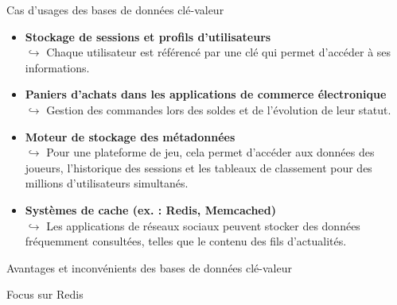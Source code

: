 \begin{frame}{Cas d'usages des bases de données clé-valeur}
    \begin{itemize}
        \item \textbf{Stockage de sessions et profils d'utilisateurs}\\
        $\hookrightarrow$ Chaque utilisateur est référencé par une clé qui permet d'accéder à ses informations.
        \vspace{0.3cm}

        \item \textbf{Paniers d'achats dans les applications de commerce électronique}\\
        $\hookrightarrow$ Gestion des commandes lors des soldes et de l'évolution de leur statut.
        \vspace{0.3cm}

        \item \textbf{Moteur de stockage des métadonnées}\\
        $\hookrightarrow$ Pour une plateforme de jeu, cela permet d'accéder aux données des joueurs, l'historique des sessions et les tableaux de classement pour des millions d'utilisateurs simultanés.
        \vspace{0.3cm}

        \item \textbf{Systèmes de cache (ex. : Redis, Memcached)}\\
        $\hookrightarrow$ Les applications de réseaux sociaux peuvent stocker des données fréquemment consultées, telles que le contenu des fils d'actualités.
    \end{itemize}
\end{frame}

\begin{frame}{Avantages et inconvénients des bases de données clé-valeur}
    \vfill
    \vfill
    \pause
    \vfill
\end{frame}


\begin{frame}{Focus sur Redis}

\end{frame}
